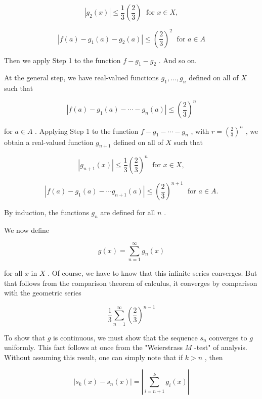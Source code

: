 \[
\left| {{g}_{2}\left( x\right) }\right|  \leq  \frac{1}{3}\left( \frac{2}{3}\right) \;\text{ for }x \in  X,
\]

\[
\left| {f\left( a\right)  - {g}_{1}\left( a\right)  - {g}_{2}\left( a\right) }\right|  \leq  {\left( \frac{2}{3}\right) }^{2}\;\text{ for }a \in  A
\]

Then we apply Step 1 to the function \(f - {g}_{1} - {g}_{2}\) . And so on.

At the general step, we have real-valued functions \({g}_{1},\ldots ,{g}_{n}\) defined on all of \(X\) such that

\[
\left| {f\left( a\right)  - {g}_{1}\left( a\right)  - \cdots  - {g}_{n}\left( a\right) }\right|  \leq  {\left( \frac{2}{3}\right) }^{n}
\]

for \(a \in  A\) . Applying Step 1 to the function \(f - {g}_{1} - \cdots  - {g}_{n}\) , with \(r = {\left( \frac{2}{3}\right) }^{n}\) , we obtain a real-valued function \({g}_{n + 1}\) defined on all of \(X\) such that

\[
\left| {{g}_{n + 1}\left( x\right) }\right|  \leq  \frac{1}{3}{\left( \frac{2}{3}\right) }^{n}\;\text{ for }x \in  X,
\]

\[
\left| {f\left( a\right)  - {g}_{1}\left( a\right)  - \cdots {g}_{n + 1}\left( a\right) }\right|  \leq  {\left( \frac{2}{3}\right) }^{n + 1}\;\text{ for }a \in  A.
\]

By induction, the functions \({g}_{n}\) are defined for all \(n\) .

We now define

\[
g\left( x\right)  = \mathop{\sum }\limits_{{n = 1}}^{\infty }{g}_{n}\left( x\right)
\]

for all \(x\) in \(X\) . Of course, we have to know that this infinite series converges. But that follows from the comparison theorem of calculus, it converges by comparison with the geometric series

\[
\frac{1}{3}\mathop{\sum }\limits_{{n = 1}}^{\infty }{\left( \frac{2}{3}\right) }^{n - 1}
\]

To show that \(g\) is continuous, we must show that the sequence \({s}_{n}\) converges to \(g\) uniformly. This fact follows at once from the "Weierstrass \(M\) -test" of analysis. Without assuming this result, one can simply note that if \(k > n\) , then

\[
\left| {{s}_{k}\left( x\right)  - {s}_{n}\left( x\right) }\right|  = \left| {\mathop{\sum }\limits_{{i = n + 1}}^{k}{g}_{i}\left( x\right) }\right|
\]

